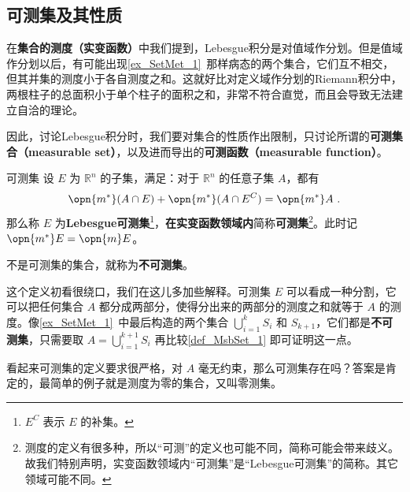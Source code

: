 

\subsection{可测集及其性质}

在\textbf{集合的测度（实变函数）}中我们提到，Lebesgue积分是对值域作分划。但是值域作分划以后，有可能出现\autoref{ex_SetMet_1}~那样病态的两个集合，它们互不相交，但其并集的测度小于各自测度之和。这就好比对定义域作分划的Riemann积分中，两根柱子的总面积小于单个柱子的面积之和，非常不符合直觉，而且会导致无法建立自洽的理论。

因此，讨论Lebesgue积分时，我们要对集合的性质作出限制，只讨论所谓的\textbf{可测集合（measurable set）}，以及进而导出的\textbf{可测函数（measurable function）}。

\begin{definition}{可测集}\label{def_MsbSet_1}
设 $E$ 为 $\mathbb{R}^n$ 的子集，满足：对于 $\mathbb{R}^n$ 的任意子集 $A$，都有
\begin{equation}
\opn{m^*}(A\cap E)+\opn{m^*}(A\cap E^C)=\opn{m^*}A~.
\end{equation}
那么称 $E$ 为\textbf{Lebesgue可测集}\footnote{$E^C$ 表示 $E$ 的补集。}，\textbf{在实变函数领域内}简称\textbf{可测集}\footnote{测度的定义有很多种，所以“可测”的定义也可能不同，简称可能会带来歧义。故我们特别声明，实变函数领域内“可测集”是“Lebesgue可测集”的简称。其它领域可能不同。}。此时记 $\opn{m^*}E=\opn{m}E$。

不是可测集的集合，就称为\textbf{不可测集}。

\end{definition}

这个定义初看很绕口，我们在这儿多加些解释。可测集 $E$ 可以看成一种分割，它可以把任何集合 $A$ 都分成两部分，使得分出来的两部分的测度之和就等于 $A$ 的测度。像\autoref{ex_SetMet_1}~中最后构造的两个集合 $\bigcup_{i=1}^k S_i$ 和 $S_{k+1}$，它们都是\textbf{不可测集}，只需要取 $A=\bigcup^{k+1}_{i=1} S_i$ 再比较\autoref{def_MsbSet_1} 即可证明这一点。

看起来可测集的定义要求很严格，对 $A$ 毫无约束，那么可测集存在吗？答案是肯定的，最简单的例子就是测度为零的集合，又叫零测集。

